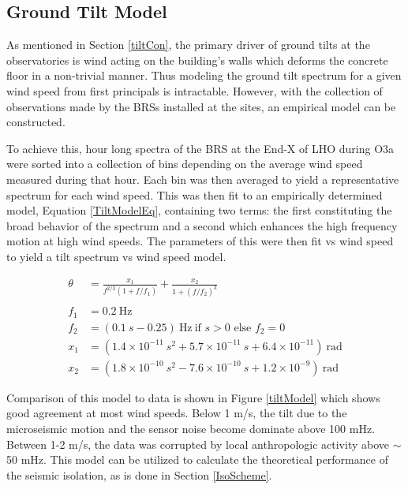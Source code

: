 \documentclass [12pt, proquest]{uwthesis}[2019]
\begin{document}
\subsection{Ground Tilt Model}

As mentioned in Section \ref{tiltCon}, the primary driver of ground tilts at the observatories is wind acting on the building's walls which deforms the concrete floor in a non-trivial manner. Thus modeling the ground tilt spectrum for a given wind speed from first principals is intractable. However, with the collection of observations made by the BRSs installed at the sites, an empirical model can be constructed.

To achieve this, hour long spectra of the BRS at the End-X of LHO during O3a were sorted into a collection of bins depending on the average wind speed measured during that hour. Each bin was then averaged to yield a representative spectrum for each wind speed. This was then fit to an empirically determined model, Equation \ref{TiltModelEq}, containing two terms: the first constituting the broad behavior of the spectrum and a second which enhances the high frequency motion at high wind speeds. The parameters of this were then fit vs wind speed to yield a tilt spectrum vs wind speed model. 

\begin{align}
\theta&=\frac{x_1}{f^{2/3}(1+f/f_1)} +\frac{x_2}{1+(f/f_2)^3}\label{TiltModelEq}\\
\nonumber \\ 
f_1&=0.2\ \text{Hz}\nonumber \\
f_2&=(0.1\ s -0.25)\ \text{Hz}\ \text{if }s>0\text{ else }f_2=0\nonumber \\
x_1&=(1.4\times10^{-11}\ s^2+5.7\times10^{-11}\ s+6.4\times10^{-11})\ \text{rad}\nonumber \\
x_2&=(1.8\times10^{-10}\ s^2-7.6\times10^{-10}\ s+1.2\times10^{-9})\ \text{rad}\nonumber
\end{align}


Comparison of this model to data is shown in Figure \ref{tiltModel} which shows good agreement at most wind speeds. Below 1 m/s, the tilt due to the microseismic motion and the sensor noise become dominate above 100 mHz. Between 1-2 m/s, the data was corrupted by local anthropologic activity above $\sim$ 50 mHz. This model can be utilized to calculate the theoretical performance of the seismic isolation, as is done in Section \ref{IsoScheme}.
\end{document}
